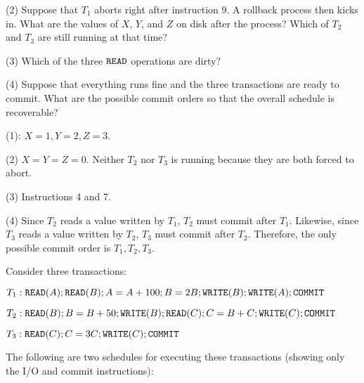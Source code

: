 \vgap

(2) Suppose that $T_1$ aborts right after instruction 9. A rollback process then kicks in. What are the values of $X$, $Y$, and $Z$ on disk after the process? Which of $T_2$ and $T_3$ are still running at that time?

\vgap

(3) Which of the three $\texttt{READ}$ operations are dirty?

\vgap

(4) Suppose that everything runs fine and the three transactions are ready to commit. What are the possible commit orders so that the overall schedule is recoverable?

\begin{sol}
 (1): $X = 1, Y = 2, Z = 3$.

\vgap

(2) $X = Y = Z = 0$. Neither $T_2$ nor $T_3$ is running because they are both forced to abort.

\vgap

(3) Instructions 4 and 7.

\vgap

(4) Since $T_2$ reads a value written by $T_1$, $T_2$ must commit after $T_1$. Likewise, since $T_3$ reads a value written by $T_2$, $T_3$ must commit after $T_2$. Therefore, the only possible commit order is $T_1, T_2, T_3$.
\end{sol}

 Consider three transactions:

$T_1: \texttt{READ}(A); \texttt{READ}(B); A = A + 100; B = 2B; \texttt{WRITE}(B); \texttt{WRITE}(A); \texttt{COMMIT}$

$T_2: \texttt{READ}(B); B = B + 50; \texttt{WRITE}(B); \texttt{READ}(C); C = B + C; \texttt{WRITE}(C); \texttt{COMMIT}$

$T_3: \texttt{READ}(C); C = 3C; \texttt{WRITE}(C); \texttt{COMMIT}$

The following are two schedules for executing these transactions (showing only the I/O and commit instructions):

